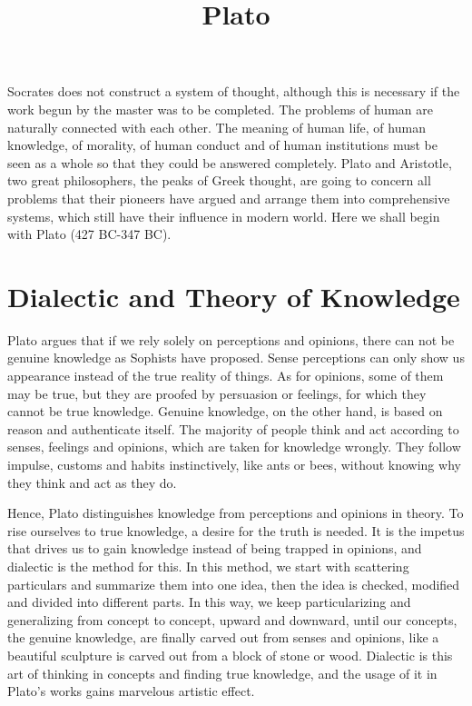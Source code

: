 \documentclass[11pt]{article}
\title{Plato}
\date{}
\begin{document}
  \maketitle

  \linenumbers

Socrates does not construct a system of thought, although this is necessary if the work begun by the master was to be completed. 
The problems of human are naturally connected with each other. 
The meaning of human life, of human knowledge, of morality, of human conduct and of human institutions must be seen as a whole so that they could be answered completely. 
Plato and Aristotle, two great philosophers, the peaks of Greek thought, are going to concern all problems that their pioneers have argued and arrange them into comprehensive systems, which still have their influence in modern world. 
Here we shall begin with Plato (427 BC-347 BC).

\section{Dialectic and Theory of Knowledge}
Plato argues that if we rely solely on perceptions and opinions, there can not be genuine knowledge as Sophists have proposed. 
Sense perceptions can only show us appearance instead of the true reality of things. 
As for opinions, some of them may be true, but they are proofed by persuasion or feelings, for which they cannot be true knowledge. 
Genuine knowledge, on the other hand, is based on reason and authenticate itself. 
The majority of people think and act according to senses, feelings and opinions, which are taken for knowledge wrongly. 
They follow impulse, customs and habits instinctively, like ants or bees, without knowing why they think and act as they do.

\newline

Hence, Plato distinguishes knowledge from perceptions and opinions in theory. 
To rise ourselves to true knowledge, a desire for the truth is needed. 
It is the impetus that drives us to gain knowledge instead of being trapped in opinions, and dialectic is the method for this. 
In this method, we start with scattering particulars and summarize them into one idea, then the idea is checked, modified and divided into different parts. 
In this way, we keep particularizing and generalizing from concept to concept, upward and downward, until our concepts, the genuine knowledge, are finally carved out from senses and opinions, like a beautiful sculpture is carved out from a block of stone or wood. 
Dialectic is this art of thinking in concepts and finding true knowledge, and the usage of it in Plato’s works gains marvelous artistic effect.
\end{document}
